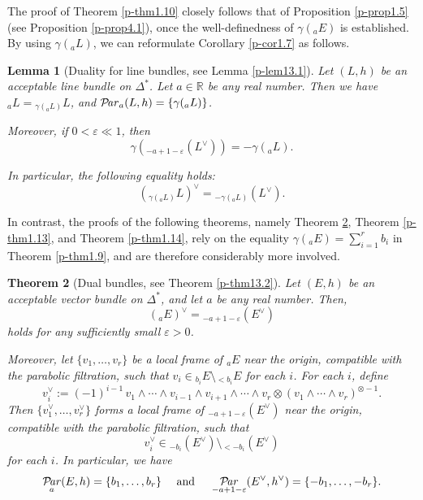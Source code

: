 \documentclass[12pt,twoside]{amsart}
\DeclareMathOperator{\Par}{\mathcal{P}\!\it{ar}}
\newtheorem{thm}{Theorem}[section]
\newtheorem{lem}[thm]{Lemma}
\theoremstyle{definition}
\begin{document}
The proof of Theorem \ref{p-thm1.10} closely follows 
that of Proposition \ref{p-prop1.5} (see Proposition \ref{p-prop4.1}), 
once the well-definedness of $\gamma({}_a E)$ is established. 
By using $\gamma ({}_a L)$, we can reformulate Corollary 
\ref{p-cor1.7} as follows. 

\begin{lem}[Duality for line bundles, see Lemma \ref{p-lem13.1}]\label{p-lem1.11}
Let $(L, h)$ be an acceptable line bundle on $\Delta^*$.  
Let $a\in \mathbb{R}$ be any real number.  
Then we have ${}_a L = {}_{\gamma({}_a L)} L$, 
and $\Par_a(L, h) = \{ \gamma({}_a L) \}$.   

Moreover, if $0 < \varepsilon \ll 1$, then  
\[
\gamma({}_{-a + 1 - \varepsilon}(L^\vee)) = -\gamma({}_a L).
\]  

In particular, the following equality holds:
\[
\left({}_{\gamma({}_a L)} L\right)^\vee = {}_{-\gamma({}_a L)}(L^\vee).
\]
\end{lem}

In contrast, the proofs of the following 
theorems, namely Theorem \ref{p-thm1.12}, 
Theorem \ref{p-thm1.13}, and 
Theorem \ref{p-thm1.14}, rely on the 
equality $\gamma({}_a E) = \sum_{i=1}^r b_i$ 
in Theorem \ref{p-thm1.9}, and are therefore considerably more involved.

\begin{thm}[Dual bundles, see Theorem \ref{p-thm13.2}]\label{p-thm1.12} 
Let $(E, h)$ be an acceptable vector bundle on $\Delta^*$, 
and let $a$ be any real number. Then,
\[
\left({}_a E\right)^\vee = {}_{-a + 1 - \varepsilon}\left(E^\vee\right)
\]
holds for any sufficiently small $\varepsilon > 0$. 

Moreover, let $\{v_1, \ldots, v_r\}$ be a local frame of ${}_a E$ near the origin, 
compatible with the parabolic filtration, such that 
$v_i \in {}_{b_i} E \setminus {}_{<b_i} E$ for each $i$. 
For each $i$, define
\[ 
v_i^\vee := (-1)^{i-1} \, v_1 \wedge 
\cdots \wedge v_{i-1} \wedge v_{i+1} \wedge 
\cdots \wedge v_r \otimes (v_1 \wedge \cdots \wedge v_r)^{\otimes -1}.
\] 
Then $\{v_1^\vee, \ldots, v_r^\vee\}$ forms a local frame of ${}_{-a + 1 - \varepsilon}(E^\vee)$ 
near the origin, compatible with the parabolic filtration, such that 
\[
v_i^\vee \in {}_{-b_i}(E^\vee) \setminus {}_{<-b_i}(E^\vee)
\]
for each $i$. In particular, we have 
\[
\Par _a(E, h)=\{b_1, \ldots, b_r\} \quad 
\text{ and }\quad \Par _{-a+1-\varepsilon} (E^\vee, h^\vee)=\{ -b_1, \ldots, -b_r\}. 
\]
\end{thm}
\end{document}
